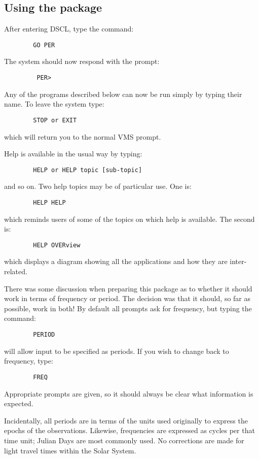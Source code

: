 \subsection {Using the package}
After entering DSCL, type the command:
\begin{verbatim}
        GO PER
\end{verbatim}
The system should now respond with the prompt:
\begin{verbatim}
         PER>
\end{verbatim}
Any of the programs described below can now be run simply by typing their name.
To leave the system type:
\begin{verbatim}
        STOP or EXIT
\end{verbatim}
which will return you to the normal VMS prompt.

Help is available in the usual way by typing:
\begin{verbatim}
        HELP or HELP topic [sub-topic]
\end{verbatim}
and so on.
Two help topics may be of particular use.
One is:
\begin{verbatim}
        HELP HELP
\end{verbatim}
which reminds users of some of the topics on which help is available.
The second is:
\begin{verbatim}
        HELP OVERview
\end{verbatim}
which displays a diagram showing all the applications and how they are
inter-related.

There was some discussion when preparing this package as to whether it should
work in terms of frequency or period.
The decision was that it should, so far as possible, work in both!
By default all prompts ask for frequency, but typing the command:
\begin{verbatim}
        PERIOD
\end{verbatim}
will allow input to be specified as periods.
If you wish to change back to frequency, type:
\begin{verbatim}
        FREQ
\end{verbatim}
Appropriate prompts are given, so it should always be clear what information is
expected.

Incidentally, all periods are in terms of the units used originally to express the
epochs of the observations.
Likewise, frequencies are expressed as cycles per that time unit; Julian Days
are most commonly used.
No corrections are made for light travel times within the Solar System.

